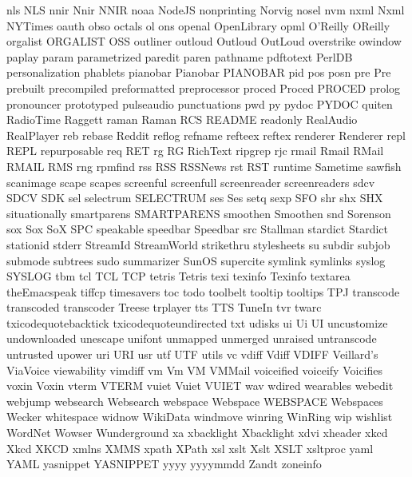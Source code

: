 nls
NLS
nnir
Nnir
NNIR
noaa
NodeJS
nonprinting
Norvig
nosel
nvm
nxml
Nxml
NYTimes
oauth
obso
octals
ol
ons
openal
OpenLibrary
opml
O'Reilly
OReilly
orgalist
ORGALIST
OSS
outliner
outloud
Outloud
OutLoud
overstrike
owindow
paplay
param
parametrized
paredit
paren
pathname
pdftotext
PerlDB
personalization
phablets
pianobar
Pianobar
PIANOBAR
pid
pos
posn
pre
Pre
prebuilt
precompiled
preformatted
preprocessor
proced
Proced
PROCED
prolog
pronouncer
prototyped
pulseaudio
punctuations
pwd
py
pydoc
PYDOC
quiten
RadioTime
Raggett
raman
Raman
RCS
README
readonly
RealAudio
RealPlayer
reb
rebase
Reddit
reflog
refname
refteex
reftex
renderer
Renderer
repl
REPL
repurposable
req
RET
rg
RG
RichText
ripgrep
rjc
rmail
Rmail
RMail
RMAIL
RMS
rng
rpmfind
rss
RSS
RSSNews
rst
RST
runtime
Sametime
sawfish
scanimage
scape
scapes
screenful
screenfull
screenreader
screenreaders
sdcv
SDCV
SDK
sel
selectrum
SELECTRUM
ses
Ses
setq
sexp
SFO
shr
shx
SHX
situationally
smartparens
SMARTPARENS
smoothen
Smoothen
snd
Sorenson
sox
Sox
SoX
SPC
speakable
speedbar
Speedbar
src
Stallman
stardict
Stardict
stationid
stderr
StreamId
StreamWorld
strikethru
stylesheets
su
subdir
subjob
submode
subtrees
sudo
summarizer
SunOS
supercite
symlink
symlinks
syslog
SYSLOG
tbm
tcl
TCL
TCP
tetris
Tetris
texi
texinfo
Texinfo
textarea
theEmacspeak
tiffcp
timesavers
toc
todo
toolbelt
tooltip
tooltips
TPJ
transcode
transcoded
transcoder
Treese
trplayer
tts
TTS
TuneIn
tvr
twarc
txicodequotebacktick
txicodequoteundirected
txt
udisks
ui
Ui
UI
uncustomize
undownloaded
unescape
unifont
unmapped
unmerged
unraised
untranscode
untrusted
upower
uri
URI
usr
utf
UTF
utils
vc
vdiff
Vdiff
VDIFF
Veillard's
ViaVoice
viewability
vimdiff
vm
Vm
VM
VMMail
voiceified
voiceify
Voicifies
voxin
Voxin
vterm
VTERM
vuiet
Vuiet
VUIET
wav
wdired
wearables
webedit
webjump
websearch
Websearch
webspace
Webspace
WEBSPACE
Webspaces
Wecker
whitespace
widnow
WikiData
windmove
winring
WinRing
wip
wishlist
WordNet
Wowser
Wunderground
xa
xbacklight
Xbacklight
xdvi
xheader
xkcd
Xkcd
XKCD
xmlns
XMMS
xpath
XPath
xsl
xslt
Xslt
XSLT
xsltproc
yaml
YAML
yasnippet
YASNIPPET
yyyy
yyyymmdd
Zandt
zoneinfo
